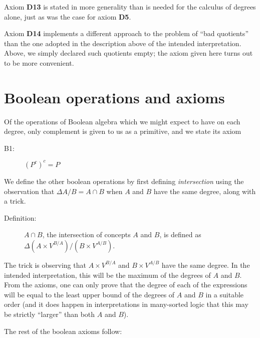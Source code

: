 Axiom {\bf D13} is stated in more generality than is needed for the
calculus of degrees alone, just as was the case for axiom {\bf D5}.

Axiom {\bf D14} implements a different approach to the problem of
``bad quotients'' than the one adopted in the description above of the
intended interpretation.  Above, we simply declared such quotients
empty; the axiom given here turns out to be more convenient.

\section{Boolean operations and axioms}

Of the operations of Boolean algebra which we might expect to have on
each degree, only complement is given to us as a primitive, and we
state its axiom
\begin{description}

\item[B1:]  $(P^c)^c = P$

\end{description}
We define the other boolean operations by first defining {\em
intersection\/} using the observation that $\Delta A/B = A \cap B$
when $A$ and $B$ have the same degree, along with a trick.

\begin{description}

\item[Definition:]  $A \cap B$, the intersection of concepts $A$ and $B$, is defined as $\Delta(A \times V^{B/A})/(B\times V^{A/B})$.

\end{description}

The trick is observing that $A \times V^{B/A}$ and $B\times V^{A/B}$
have the same degree.  In the intended interpretation, this will be
the maximum of the degrees of $A$ and $B$.  From the axioms, one can
only prove that the degree of each of the expressions will be equal to
the least upper bound of the degrees of $A$ and $B$ in a suitable
order (and it does happen in interpretations in many-sorted logic that
this may be strictly ``larger'' than both $A$ and $B$).

The rest of the boolean axioms follow:

